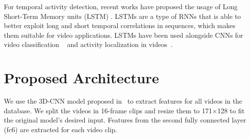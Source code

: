 \documentclass{article}
\begin{document}
For temporal activity detection, recent works have proposed the usage of Long Short-Term Memory units (LSTM) \cite{}. LSTMs are a type of RNNs that is able to better exploit long and short temporal correlations in sequences, which makes them suitable for video applications. LSTMs have been used alongside CNNs for video classification ~\cite{yao2015describing} and activity localization in videos~\cite{yeung2015every}.


\section{Proposed Architecture}



We use the 3D-CNN model proposed in~\cite{tran2014learning} to extract features for all videos in the database. We split the videos in 16-frame clips and resize them to 171$\times$128 to fit the original model's desired input. Features from the second fully connected layer (fc6) are extracted for each video clip.

\end{document}
